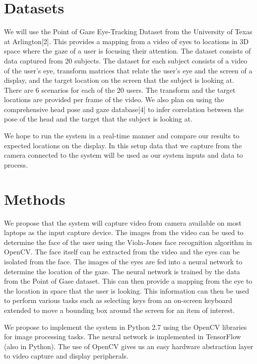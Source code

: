 \documentclass[10pt,twocolumn,letterpaper]{article}
\begin{document}
\section{Datasets}
We will use the Point of Gaze Eye-Tracking Dataset from the University
of Texas at Arlington[2]. This provides a mapping from a video of eyes
to locations in 3D space where the gaze of a user is focusing their
attention. The dataset consists of data captured from 20 subjects. The
dataset for each subject consists of a video of the user’s eye,
transform matrices that relate the user’s eye and the screen of a
display, and the target location on the screen that the subject is
looking at. There are 6 scenarios for each of the 20 users. The
transform and the target locations are provided per frame of the
video. We also plan on using the comprehensive head pose and gaze
database[4] to infer correlation between the pose of the head and the
target that the subject is looking at.

We hope to run the system in a real-time manner and compare our
results to expected locations on the display. In this setup data that
we capture from the camera connected to the system will be used as our
system inputs and data to process.

\section{Methods}
We propose that the system will capture video from camera available on
most laptops as the input capture device. The images from the video
can be used to determine the face of the user using the Viola-Jones
face recognition algorithm in OpenCV. The face itself can be extracted
from the video and the eyes can be isolated from the face. The images
of the eyes are fed into a neural network to determine the location of
the gaze. The neural network is trained by the data from the Point of
Gase dataset. This can then provide a mapping from the eye to the
location in space that the user is looking. This information can then
be used to perform various tasks such as selecting keys from an
on-screen keyboard extended to move a bounding box around the screen
for an item of interest.

We propose to implement the system in Python 2.7 using the OpenCV
libraries for image processing tasks. The neural network is
implemented in TensorFlow (also in Python). The use of OpenCV gives us
an easy hardware abstraction layer to video capture and display
peripherals.
\end{document}
